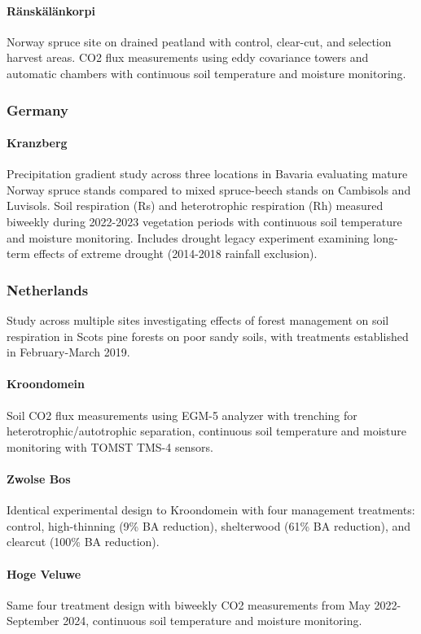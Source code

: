 \documentclass[12pt,a4paper]{article}
\begin{document}
\paragraph{Ränskälänkorpi}
Norway spruce site on drained peatland with control, clear-cut, and selection harvest areas. CO2 flux measurements using eddy covariance towers and automatic chambers with continuous soil temperature and moisture monitoring.

\subsubsection{Germany}
\paragraph{Kranzberg}
Precipitation gradient study across three locations in Bavaria evaluating mature Norway spruce stands compared to mixed spruce-beech stands on Cambisols and Luvisols. Soil respiration (Rs) and heterotrophic respiration (Rh) measured biweekly during 2022-2023 vegetation periods with continuous soil temperature and moisture monitoring. Includes drought legacy experiment examining long-term effects of extreme drought (2014-2018 rainfall exclusion).

\subsubsection{Netherlands}
Study across multiple sites investigating effects of forest management on soil respiration in Scots pine forests on poor sandy soils, with treatments established in February-March 2019.
\paragraph{Kroondomein} Soil CO2 flux measurements using EGM-5 analyzer with trenching for heterotrophic/autotrophic separation, continuous soil temperature and moisture monitoring with TOMST TMS-4 sensors.
\paragraph{Zwolse Bos} Identical experimental design to Kroondomein with four management treatments: control, high-thinning (9\% BA reduction), shelterwood (61\% BA reduction), and clearcut (100\% BA reduction).
\paragraph{Hoge Veluwe} Same four treatment design with biweekly CO2 measurements from May 2022-September 2024, continuous soil temperature and moisture monitoring.
\end{document}
